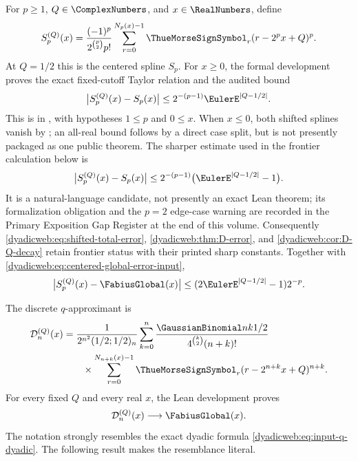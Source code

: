 \documentclass[11pt,oneside]{article}
\theoremstyle{definition}
\theoremstyle{remark}
\begin{document}
For $p\ge1$, $Q\in\ComplexNumbers$, and $x\in\RealNumbers$, define
\begin{equation}
 S_p^{(Q)}(x)=
 \frac{(-1)^p}{2^{\binom p2}p!}
 \sum_{r=0}^{N_p(x)-1}\ThueMorseSignSymbol_r(r-2^px+Q)^p.                  \label{dyadicweb:eq:shifted-spline-local}
\end{equation}
At $Q=1/2$ this is the centered spline $S_p$.  For $x\ge0$, the formal development proves
the exact fixed-cutoff Taylor relation and the audited bound
\begin{equation}
 \bigl|S_p^{(Q)}(x)-S_p(x)\bigr|
 \le2^{-(p-1)}\EulerE^{|Q-1/2|}.                              \label{dyadicweb:eq:shifted-spline-bound-formal}
\end{equation}
This is  in
, with hypotheses $1\le p$ and $0\le x$.  When $x\le0$,
both shifted splines vanish by ; an all-real
bound follows by a direct case split, but is not presently packaged as one public theorem.
The sharper estimate used in the frontier calculation below is
\begin{equation}
 \bigl|S_p^{(Q)}(x)-S_p(x)\bigr|
 \le2^{-(p-1)}\bigl(\EulerE^{|Q-1/2|}-1\bigr).                 \label{dyadicweb:eq:shifted-spline-bound-local}
\end{equation}
It is a natural-language candidate, not presently an exact Lean theorem; its formalization
obligation and the $p=2$ edge-case warning are recorded in the Primary Exposition Gap
Register at the end of this volume.  Consequently
\eqref{dyadicweb:eq:shifted-total-error}, \cref{dyadicweb:thm:D-error}, and
\cref{dyadicweb:cor:D-Q-decay} retain frontier status with their printed sharp constants.
Together with \eqref{dyadicweb:eq:centered-global-error-input},
\begin{equation}
 \bigl|S_p^{(Q)}(x)-\FabiusGlobal(x)\bigr|
 \le(2\EulerE^{|Q-1/2|}-1)2^{-p}.                              \label{dyadicweb:eq:shifted-total-error}
\end{equation}

The discrete $q$-approximant is
\begin{align}
 \mathcal D_n^{(Q)}(x)
 &=\frac1{2^{n^2}(1/2;1/2)_n}
 \sum_{k=0}^{n}
 \frac{\GaussianBinomial nk{1/2}}{4^{\binom k2}(n+k)!}             \notag\\
 &\qquad\times
 \sum_{r=0}^{N_{n+k}(x)-1}\ThueMorseSignSymbol_r
       (r-2^{n+k}x+Q)^{n+k}.                              \label{dyadicweb:eq:DnQ-local}
\end{align}
For every fixed $Q$ and every real $x$, the Lean development proves
\begin{equation}
 \mathcal D_n^{(Q)}(x)\longrightarrow\FabiusGlobal(x).       \label{dyadicweb:eq:DnQ-limit-local}
\end{equation}
The notation strongly resembles the exact dyadic formula
\eqref{dyadicweb:eq:input-q-dyadic}.  The following result makes the resemblance literal.
\end{document}
